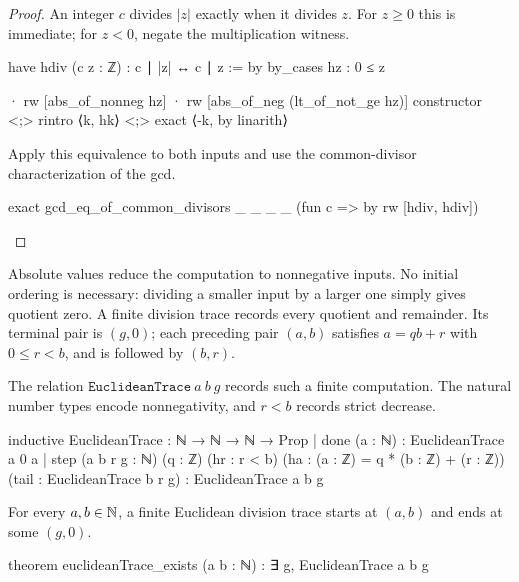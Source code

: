 \begin{proof}
  An integer $c$ divides $|z|$ exactly when it divides $z$.
  For $z\ge0$ this is immediate; for $z<0$, negate the multiplication witness.

  \begin{lean}
    have hdiv (c z : ℤ) : c ∣ |z| ↔ c ∣ z := by
      by_cases hz : 0 ≤ z

      · rw [abs_of_nonneg hz]
      · rw [abs_of_neg (lt_of_not_ge hz)]
        constructor <;> rintro ⟨k, hk⟩ <;> exact ⟨-k, by linarith⟩
  \end{lean}

  Apply this equivalence to both inputs and use the common-divisor characterization of the gcd.

  \begin{lean}
    exact gcd_eq_of_common_divisors _ _ _ _ (fun c => by rw [hdiv, hdiv])
  \end{lean}
\end{proof}

Absolute values reduce the computation to nonnegative inputs.
No initial ordering is necessary: dividing a smaller input by a larger one simply gives quotient
zero.
A finite division trace records every quotient and remainder.
Its terminal pair is $(g,0)$; each preceding pair $(a,b)$ satisfies $a=qb+r$ with $0\le r<b$, and
is followed by $(b,r)$.

\begin{definition}
  The relation $\texttt{EuclideanTrace}\ a\ b\ g$ records such a finite computation.
  The natural number types encode nonnegativity, and $r<b$ records strict decrease.

  \begin{lean}
    inductive EuclideanTrace : ℕ → ℕ → ℕ → Prop
      | done (a : ℕ) : EuclideanTrace a 0 a
      | step (a b r g : ℕ) (q : ℤ) (hr : r < b)
          (ha : (a : ℤ) = q * (b : ℤ) + (r : ℤ))
          (tail : EuclideanTrace b r g) : EuclideanTrace a b g
  \end{lean}
\end{definition}

\begin{theorem}
  \label{ent:thm:euclidean-termination}
  For every $a,b\in\mathbb{N}$, a finite Euclidean division trace starts at $(a,b)$ and ends at some
  $(g,0)$.

  \begin{lean}
    theorem euclideanTrace_exists (a b : ℕ) : ∃ g, EuclideanTrace a b g
  \end{lean}
\end{theorem}

